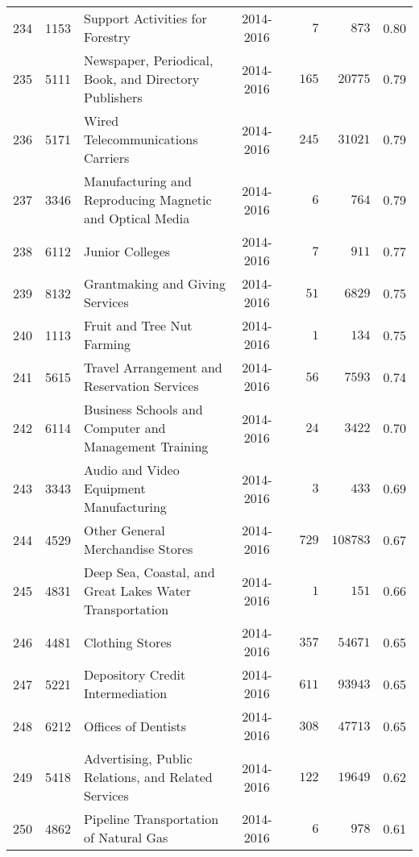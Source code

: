 \documentclass[9pt, oneside]{article}   	%
\begin{document}
\begin{longtable}{lcp{3in}cccc}
234  & 1153 & Support Activities for Forestry & 2014-2016 & $\phantom{0000}7$ & $\phantom{000}873$ &  0.80 \\
235  & 5111 & Newspaper, Periodical, Book, and Directory Publishers & 2014-2016 & $\phantom{00}165$ & $\phantom{0}20775$ &  0.79 \\
236  & 5171 & Wired Telecommunications Carriers & 2014-2016 & $\phantom{00}245$ & $\phantom{0}31021$ &  0.79 \\
237  & 3346 & Manufacturing and Reproducing Magnetic and Optical Media & 2014-2016 & $\phantom{0000}6$ & $\phantom{000}764$ &  0.79 \\
238  & 6112 & Junior Colleges & 2014-2016 & $\phantom{0000}7$ & $\phantom{000}911$ &  0.77 \\
239  & 8132 & Grantmaking and Giving Services & 2014-2016 & $\phantom{000}51$ & $\phantom{00}6829$ &  0.75 \\
240  & 1113 & Fruit and Tree Nut Farming & 2014-2016 & $\phantom{0000}1$ & $\phantom{000}134$ &  0.75 \\
241  & 5615 & Travel Arrangement and Reservation Services & 2014-2016 & $\phantom{000}56$ & $\phantom{00}7593$ &  0.74 \\
242  & 6114 & Business Schools and Computer and Management Training & 2014-2016 & $\phantom{000}24$ & $\phantom{00}3422$ &  0.70 \\
243  & 3343 & Audio and Video Equipment Manufacturing & 2014-2016 & $\phantom{0000}3$ & $\phantom{000}433$ &  0.69 \\
244  & 4529 & Other General Merchandise Stores & 2014-2016 & $\phantom{00}729$ & $108783$ &  0.67 \\
245  & 4831 & Deep Sea, Coastal, and Great Lakes Water Transportation & 2014-2016 & $\phantom{0000}1$ & $\phantom{000}151$ &  0.66 \\
246  & 4481 & Clothing Stores & 2014-2016 & $\phantom{00}357$ & $\phantom{0}54671$ &  0.65 \\
247  & 5221 & Depository Credit Intermediation & 2014-2016 & $\phantom{00}611$ & $\phantom{0}93943$ &  0.65 \\
248  & 6212 & Offices of Dentists & 2014-2016 & $\phantom{00}308$ & $\phantom{0}47713$ &  0.65 \\
249  & 5418 & Advertising, Public Relations, and Related Services & 2014-2016 & $\phantom{00}122$ & $\phantom{0}19649$ &  0.62 \\
250  & 4862 & Pipeline Transportation of Natural Gas & 2014-2016 & $\phantom{0000}6$ & $\phantom{000}978$ &  0.61 \\

\end{longtable}
\end{document}

